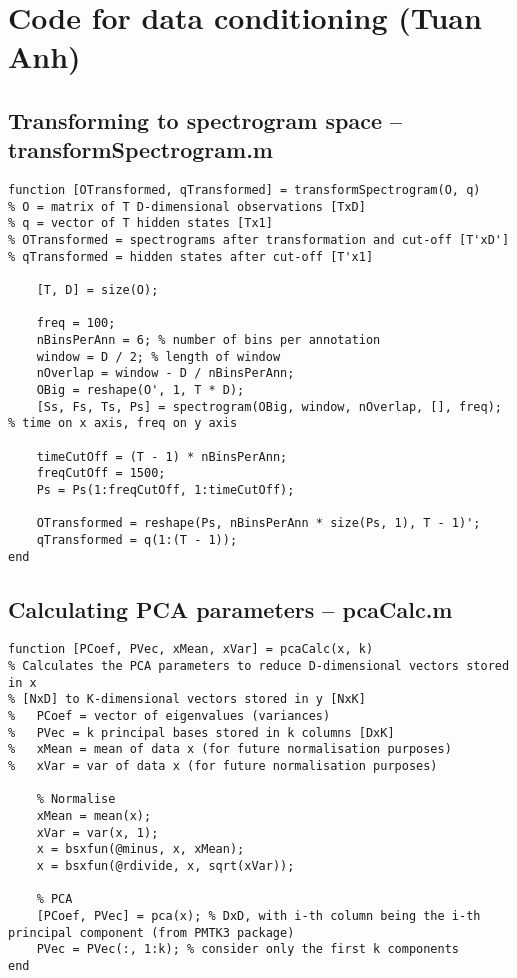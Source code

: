 \chapter{Code for data conditioning (Tuan Anh)}
\label{ch:dataConditioningCode}

\section{Transforming to spectrogram space -- transformSpectrogram.m}
\label{sec:transformSpectrogram}
\begin{lstlisting}
function [OTransformed, qTransformed] = transformSpectrogram(O, q)
% O = matrix of T D-dimensional observations [TxD]
% q = vector of T hidden states [Tx1]
% OTransformed = spectrograms after transformation and cut-off [T'xD']
% qTransformed = hidden states after cut-off [T'x1]

    [T, D] = size(O);

    freq = 100;
    nBinsPerAnn = 6; % number of bins per annotation
    window = D / 2; % length of window
    nOverlap = window - D / nBinsPerAnn;
    OBig = reshape(O', 1, T * D);
    [Ss, Fs, Ts, Ps] = spectrogram(OBig, window, nOverlap, [], freq); % time on x axis, freq on y axis
    
    timeCutOff = (T - 1) * nBinsPerAnn;
    freqCutOff = 1500;
    Ps = Ps(1:freqCutOff, 1:timeCutOff);

    OTransformed = reshape(Ps, nBinsPerAnn * size(Ps, 1), T - 1)';
    qTransformed = q(1:(T - 1));
end
\end{lstlisting}

\section{Calculating PCA parameters -- pcaCalc.m}
\label{sec:pcaCalc}
\begin{lstlisting}
function [PCoef, PVec, xMean, xVar] = pcaCalc(x, k)
% Calculates the PCA parameters to reduce D-dimensional vectors stored in x
% [NxD] to K-dimensional vectors stored in y [NxK]
%   PCoef = vector of eigenvalues (variances)
%   PVec = k principal bases stored in k columns [DxK]
%   xMean = mean of data x (for future normalisation purposes)
%   xVar = var of data x (for future normalisation purposes)
    
    % Normalise
    xMean = mean(x);
    xVar = var(x, 1);
    x = bsxfun(@minus, x, xMean);
    x = bsxfun(@rdivide, x, sqrt(xVar));
    
    % PCA
    [PCoef, PVec] = pca(x); % DxD, with i-th column being the i-th principal component (from PMTK3 package)
    PVec = PVec(:, 1:k); % consider only the first k components
end
\end{lstlisting}

